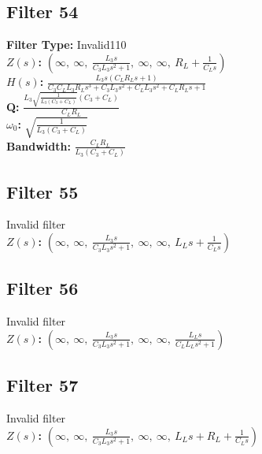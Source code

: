 \documentclass{article}
\begin{document}
\subsection*{Filter 54}
\textbf{Filter Type:} Invalid110 \\ 
\textbf{$Z(s)$:} $\left( \infty, \  \infty, \  \frac{L_{3} s}{C_{3} L_{3} s^{2} + 1}, \  \infty, \  \infty, \  R_{L} + \frac{1}{C_{L} s}\right)$ \\ 
\textbf{$H(s)$:} $\frac{L_{3} s \left(C_{L} R_{L} s + 1\right)}{C_{3} C_{L} L_{3} R_{L} s^{3} + C_{3} L_{3} s^{2} + C_{L} L_{3} s^{2} + C_{L} R_{L} s + 1}$ \\ 
\textbf{Q:} $\frac{L_{3} \sqrt{\frac{1}{L_{3} \left(C_{3} + C_{L}\right)}} \left(C_{3} + C_{L}\right)}{C_{L} R_{L}}$ \\ 
\textbf{$\omega_0$:} $\sqrt{\frac{1}{L_{3} \left(C_{3} + C_{L}\right)}}$ \\ 
\textbf{Bandwidth:} $\frac{C_{L} R_{L}}{L_{3} \left(C_{3} + C_{L}\right)}$ \\ 
\subsection*{Filter 55}
Invalid filter \\ 
\textbf{$Z(s)$:} $\left( \infty, \  \infty, \  \frac{L_{3} s}{C_{3} L_{3} s^{2} + 1}, \  \infty, \  \infty, \  L_{L} s + \frac{1}{C_{L} s}\right)$ \\ 
\subsection*{Filter 56}
Invalid filter \\ 
\textbf{$Z(s)$:} $\left( \infty, \  \infty, \  \frac{L_{3} s}{C_{3} L_{3} s^{2} + 1}, \  \infty, \  \infty, \  \frac{L_{L} s}{C_{L} L_{L} s^{2} + 1}\right)$ \\ 
\subsection*{Filter 57}
Invalid filter \\ 
\textbf{$Z(s)$:} $\left( \infty, \  \infty, \  \frac{L_{3} s}{C_{3} L_{3} s^{2} + 1}, \  \infty, \  \infty, \  L_{L} s + R_{L} + \frac{1}{C_{L} s}\right)$ \\ 
\end{document}

